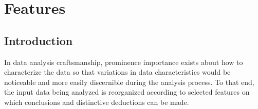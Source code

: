 









\chapter{Features}\label{ch:features}
\section{Introduction}
In data analysis craftsmanship, 
prominence importance exists 
about how to characterize the data so that 
variations in data characteristics would 
be noticeable and more 
easily discernible during the analysis process.
To that end, the input data being analyzed is reorganized
according to selected features on which
conclusions and distinctive deductions can be made.

